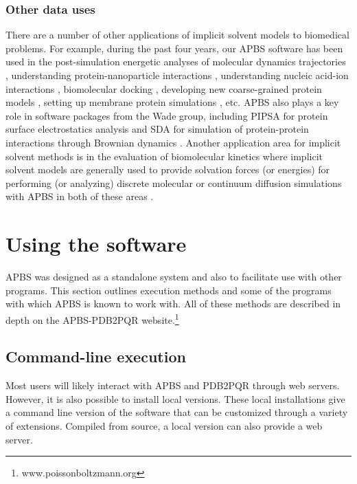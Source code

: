 \documentclass[11pt,titlepage]{article}
\begin{document}
\subsubsection{Other data uses}
There are a number of other applications of implicit solvent models to biomedical problems. For example, during the past four years, our APBS software has been used in the post-simulation energetic analyses of molecular dynamics trajectories \cite{dror2013}, understanding protein-nanoparticle interactions \cite{treuel2013, nienhaus2013, depaoli2014}, understanding nucleic acid-ion interactions \cite{lipfert2014, giambasu2014}, biomolecular docking \cite{roberts2013}, developing new coarse-grained protein models \cite{spiga2013}, setting up membrane protein simulations \cite{stansfeld2015}, etc. APBS also plays a key role in software packages from the Wade group, including PIPSA for protein surface electrostatics analysis \cite{richter2008} and SDA for simulation of protein-protein interactions through Brownian dynamics \cite{martinez2015}. Another application area for implicit solvent methods is in the evaluation of biomolecular kinetics where implicit solvent models are generally used to provide solvation forces (or energies) for performing (or analyzing) discrete molecular or continuum diffusion simulations with APBS in both of these areas \cite{dror2013, martinez2015, chen2007, song2004a, song2004b, elcock2004, mereghetti2012}.

\section{Using the software}
APBS was designed as a standalone system and also to facilitate use with other programs. This section outlines execution methods and some of the programs with which APBS is known to work with. All of these methods are described in depth on the APBS-PDB2PQR website.\footnote{www.poissonboltzmann.org}

\subsection{Command-line execution}
Most users will likely interact with APBS and PDB2PQR through web servers. However, it is also possible to install local versions. These local installations give a command line version of the  software that can be customized through a variety of extensions. Compiled from source, a local version can also provide a web server.
\end{document}
